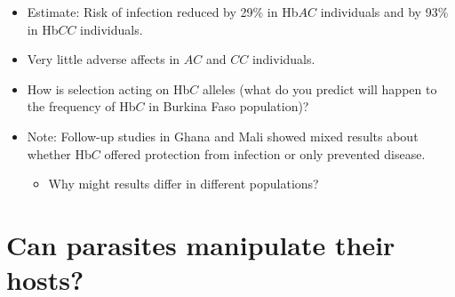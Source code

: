 \begin{frame}[t]
    \begin{adjustwidth}{-2em}{-1.5em}
        \begin{itemize}
            \item Estimate: Risk of infection reduced by 29\% in Hb$AC$
                individuals and by 93\% in Hb$CC$ individuals.

                \vspace{1mm}
            \item Very little adverse affects in $AC$ and $CC$ individuals.
            
                \vspace{1mm}
            \item How is selection acting on Hb$C$ alleles (what do you predict
                will happen to the frequency of Hb$C$ in Burkina Faso
                population)?


                \vspace{3mm}
            \item<2-> Note: Follow-up studies in Ghana and Mali showed mixed
                results about whether Hb$C$ offered protection from infection
                or only prevented disease.
            
            \begin{itemize}
                \item<2-> Why might results differ in different populations?

            \end{itemize}

        \end{itemize}

    \end{adjustwidth}
\end{frame}

\section[Can parasites manipulate their hosts?]{Can parasites manipulate their
    hosts?}

